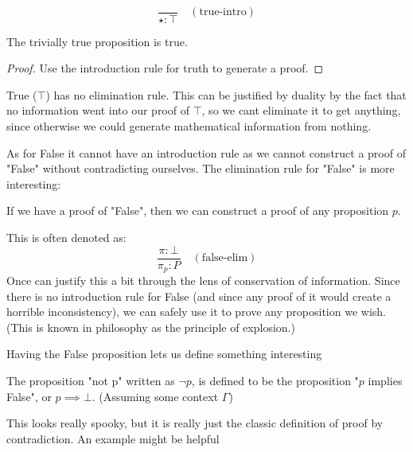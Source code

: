 \begin{equation*}
\frac{}{\star : \top}\quad(\text{true-intro})
\end{equation*} 

\begin{lemma}
    The trivially true proposition is true.
\end{lemma}
\begin{proof}
    Use the introduction rule for truth to generate a proof.
\end{proof}

True ($\top$) has no elimination rule. This can be justified by duality by the fact that no information went into our proof of $\top$, so we cant eliminate it to get anything, since otherwise we could generate mathematical information from nothing.

As for False it cannot have an introduction rule  as we cannot construct a proof of "False" without contradicting ourselves. The elimination rule for "False" is more interesting: 
\begin{definition}
If we have a proof of "False", then we can construct a proof of any proposition $p$.
\end{definition} 
This is often denoted as:
\begin{equation*}
\frac{\pi : \bot}{\pi_p : P}\quad(\text{false-elim})
\end{equation*}
Once can justify this a bit through the lens of conservation of information. Since there is no introduction rule for False (and since any proof of it would create a horrible inconsistency), we can safely use it to prove any proposition we wish. (This is known in philosophy as the principle of explosion.)

Having the False proposition lets us define something interesting
\begin{definition}[Negation]
    The proposition "not p" written as $\neg p$, is defined to be the proposition "$p$ implies False", or $p \implies \bot $. (Assuming some context $\Gamma$)
\end{definition}

This looks really spooky, but it is really just the classic definition of proof by contradiction. An example might be helpful

